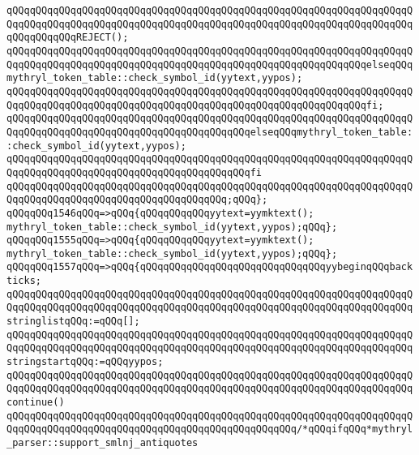 \verb|qQQqqQQqqQQqqQQqqQQqqQQqqQQqqQQqqQQqqQQqqQQqqQQqqQQqqQQqqQQqqQQqqQQqqQQqqQQqqQQqqQQqqQQqqQQqqQQqqQQqqQQqqQQqqQQqqQQqqQQqqQQqqQQqqQQqqQQqqQQqqQQqqQQqqQQqREJECT();|\newline
\verb|qQQqqQQqqQQqqQQqqQQqqQQqqQQqqQQqqQQqqQQqqQQqqQQqqQQqqQQqqQQqqQQqqQQqqQQqqQQqqQQqqQQqqQQqqQQqqQQqqQQqqQQqqQQqqQQqqQQqqQQqqQQqqQQqqQQqelseqQQqmythryl_token_table::check_symbol_id(yytext,yypos);|\newline
\verb|qQQqqQQqqQQqqQQqqQQqqQQqqQQqqQQqqQQqqQQqqQQqqQQqqQQqqQQqqQQqqQQqqQQqqQQqqQQqqQQqqQQqqQQqqQQqqQQqqQQqqQQqqQQqqQQqqQQqqQQqqQQqqQQqqQQqfi;|\newline
\verb|qQQqqQQqqQQqqQQqqQQqqQQqqQQqqQQqqQQqqQQqqQQqqQQqqQQqqQQqqQQqqQQqqQQqqQQqqQQqqQQqqQQqqQQqqQQqqQQqqQQqqQQqqQQqqQQqelseqQQqmythryl_token_table::check_symbol_id(yytext,yypos);|\newline
\verb|qQQqqQQqqQQqqQQqqQQqqQQqqQQqqQQqqQQqqQQqqQQqqQQqqQQqqQQqqQQqqQQqqQQqqQQqqQQqqQQqqQQqqQQqqQQqqQQqqQQqqQQqqQQqqQQqfi|\newline
\verb|qQQqqQQqqQQqqQQqqQQqqQQqqQQqqQQqqQQqqQQqqQQqqQQqqQQqqQQqqQQqqQQqqQQqqQQqqQQqqQQqqQQqqQQqqQQqqQQqqQQqqQQqqQQq;qQQq};|\newline
\verb|qQQqqQQq1546qQQq=>qQQq{qQQqqQQqqQQqyytext=yymktext();|\newline
\verb|mythryl_token_table::check_symbol_id(yytext,yypos);qQQq};|\newline
\verb|qQQqqQQq1555qQQq=>qQQq{qQQqqQQqqQQqyytext=yymktext();|\newline
\verb|mythryl_token_table::check_symbol_id(yytext,yypos);qQQq};|\newline
\verb|qQQqqQQq1557qQQq=>qQQq{qQQqqQQqqQQqqQQqqQQqqQQqqQQqqQQqyybeginqQQqbackticks;|\newline
\verb|qQQqqQQqqQQqqQQqqQQqqQQqqQQqqQQqqQQqqQQqqQQqqQQqqQQqqQQqqQQqqQQqqQQqqQQqqQQqqQQqqQQqqQQqqQQqqQQqqQQqqQQqqQQqqQQqqQQqqQQqqQQqqQQqqQQqqQQqqQQqstringlistqQQq:=qQQq[];|\newline
\verb|qQQqqQQqqQQqqQQqqQQqqQQqqQQqqQQqqQQqqQQqqQQqqQQqqQQqqQQqqQQqqQQqqQQqqQQqqQQqqQQqqQQqqQQqqQQqqQQqqQQqqQQqqQQqqQQqqQQqqQQqqQQqqQQqqQQqqQQqqQQqstringstartqQQq:=qQQqyypos;|\newline
\verb|qQQqqQQqqQQqqQQqqQQqqQQqqQQqqQQqqQQqqQQqqQQqqQQqqQQqqQQqqQQqqQQqqQQqqQQqqQQqqQQqqQQqqQQqqQQqqQQqqQQqqQQqqQQqqQQqqQQqqQQqqQQqqQQqqQQqqQQqqQQqcontinue()|\newline
\verb|qQQqqQQqqQQqqQQqqQQqqQQqqQQqqQQqqQQqqQQqqQQqqQQqqQQqqQQqqQQqqQQqqQQqqQQqqQQqqQQqqQQqqQQqqQQqqQQqqQQqqQQqqQQqqQQqqQQqqQQq/*qQQqifqQQq*mythryl_parser::support_smlnj_antiquotes|\newline
